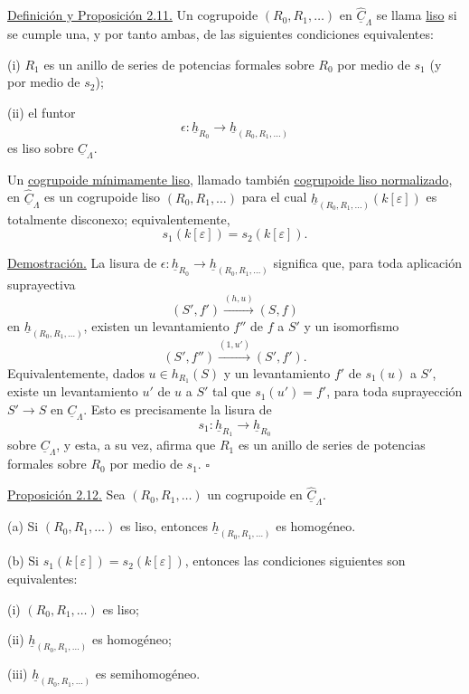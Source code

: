 \par\medskip\noindent
\underline{Definición y Proposición 2.11.} Un cogrupoide
$(R_0,R_1,\ldots)$ en $\widehat{\underline C}_\Lambda$ se llama
\underline{liso} si se cumple una, y por tanto ambas, de las siguientes
condiciones equivalentes:

(i) $R_1$ es un anillo de series de potencias formales sobre $R_0$ por
medio de $s_1$ (y por medio de $s_2$);

(ii) el funtor
\[
 \epsilon:\underline h_{R_0}
 \longrightarrow\underline h_{(R_0,R_1,\ldots)}
\]
es liso sobre $\underline C_\Lambda$.

Un \underline{cogrupoide mínimamente liso}, llamado también
\underline{cogrupoide liso normalizado}, en
$\widehat{\underline C}_\Lambda$ es un cogrupoide liso
$(R_0,R_1,\ldots)$ para el cual
$\underline h_{(R_0,R_1,\ldots)}(k[\varepsilon])$ es totalmente
disconexo; equivalentemente,
\[
 s_1(k[\varepsilon])=s_2(k[\varepsilon]).
\]

\underline{Demostración.} La lisura de
$\epsilon:\underline h_{R_0}\to
\underline h_{(R_0,R_1,\ldots)}$ significa que, para toda aplicación
suprayectiva
\[
 (S',f')\xrightarrow{(h,u)}(S,f)
\]
en $\underline h_{(R_0,R_1,\ldots)}$, existen un levantamiento $f''$ de
$f$ a $S'$ y un isomorfismo
\[
 (S',f'')\xrightarrow{(1,u')}(S',f').
\]
Equivalentemente, dados $u\in h_{R_1}(S)$ y un levantamiento $f'$ de
$s_1(u)$ a $S'$, existe un levantamiento $u'$ de $u$ a $S'$ tal que
$s_1(u')=f'$, para toda suprayección $S'\to S$ en
$\underline C_\Lambda$. Esto es precisamente la lisura de
\[
 s_1:\underline h_{R_1}\longrightarrow\underline h_{R_0}
\]
sobre $\underline C_\Lambda$, y esta, a su vez, afirma que $R_1$ es un
anillo de series de potencias formales sobre $R_0$ por medio de $s_1$.
\hfill$\square$

\underline{Proposición 2.12.} Sea $(R_0,R_1,\ldots)$ un cogrupoide en
$\widehat{\underline C}_\Lambda$.

(a) Si $(R_0,R_1,\ldots)$ es liso, entonces
$\underline h_{(R_0,R_1,\ldots)}$ es homogéneo.

(b) Si $s_1(k[\varepsilon])=s_2(k[\varepsilon])$, entonces las condiciones
siguientes son equivalentes:

(i) $(R_0,R_1,\ldots)$ es liso;

(ii) $\underline h_{(R_0,R_1,\ldots)}$ es homogéneo;

(iii) $\underline h_{(R_0,R_1,\ldots)}$ es semihomogéneo.


